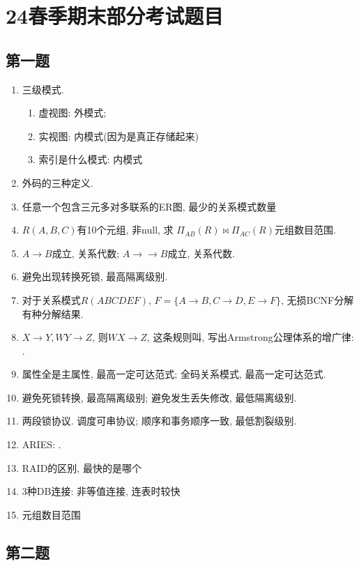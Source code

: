 \section{24春季期末部分考试题目}

\subsection{第一题}

\begin{enumerate}
    \item 三级模式.
    \begin{enumerate}
        \item 虚视图: 外模式;
        \item 实视图: 内模式(因为是真正存储起来)
        \item 索引是什么模式: 内模式
    \end{enumerate}
    \item 外码的三种定义.
    \item 任意一个包含三元多对多联系的ER图, 最少的关系模式数量
    \item $R(A,B,C)$有10个元组, 非null, 求 $\Pi_{AB}(R) \bowtie \Pi_{AC}(R)$元组数目范围.
    \item $A\to B$成立, 关系代数; $A\to \to B$成立, 关系代数.
    \item 避免出现转换死锁, 最高隔离级别.
    \item 对于关系模式$R(ABCDEF)$, $F=\{A\to B,C\to D, E\to F\}$, 无损BCNF分解有\underline{\quad}种分解结果.
    \item $X\to Y, WY\to Z$, 则$WX\to Z$, 这条规则叫\underline{\quad}, 写出Armstrong公理体系的增广律: \underline{\quad}.
    \item 属性全是主属性, 最高一定可达范式; 全码关系模式, 最高一定可达范式.
    \item 避免死锁转换, 最高隔离级别; 避免发生丢失修改, 最低隔离级别.
    \item 两段锁协议. 调度可串协议; 顺序和事务\underline{\quad}顺序一致, 最低割裂级别.
    \item ARIES: \underline{\quad \quad \quad}.
    \item RAID的区别, 最快的是哪个
    \item 3种DB连接: 非等值连接, 连表时较快
    \item 元组数目范围
\end{enumerate}

\subsection{第二题}


